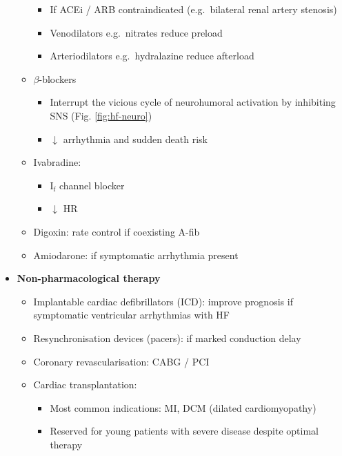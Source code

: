 \documentclass[
  12pt,
]{memoir}
\providecommand{\tightlist}{%
  \setlength{\itemsep}{0pt}\setlength{\parskip}{0pt}}
\begin{document}
\begin{itemize}
\begin{itemize}
    \begin{itemize}
    \tightlist
    \item
      If ACEi / ARB contraindicated (e.g.~bilateral renal artery
      stenosis)
    \item
      Venodilators e.g.~nitrates reduce preload
    \item
      Arteriodilators e.g.~hydralazine reduce afterload
    \end{itemize}
  \item
    \(\beta\)-blockers

    \begin{itemize}
    \tightlist
    \item
      Interrupt the vicious cycle of neurohumoral activation by
      inhibiting SNS (Fig. \ref{fig:hf-neuro})
    \item
      \(\downarrow\) arrhythmia and sudden death risk
    \end{itemize}
  \item
    Ivabradine:

    \begin{itemize}
    \tightlist
    \item
      I\(_{\text{f}}\) channel blocker
    \item
      \(\downarrow\) HR
    \end{itemize}
  \item
    Digoxin: rate control if coexisting A-fib
  \item
    Amiodarone: if symptomatic arrhythmia present
  \end{itemize}
\item
  \textbf{Non-pharmacological therapy}

  \begin{itemize}
  \tightlist
  \item
    Implantable cardiac defibrillators (ICD): improve prognosis if
    symptomatic ventricular arrhythmias with HF
  \item
    Resynchronisation devices (pacers): if marked conduction delay
  \item
    Coronary revascularisation: CABG / PCI
  \item
    Cardiac transplantation:

    \begin{itemize}
    \tightlist
    \item
      Most common indications: MI, DCM (dilated cardiomyopathy)
    \item
      Reserved for young patients with severe disease despite optimal
      therapy
    \end{itemize}
  \end{itemize}
\end{itemize}
\end{document}
